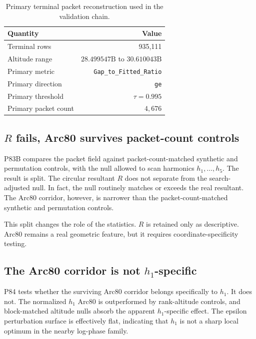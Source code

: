 \documentclass[11pt]{article}
\newcommand{\terminalrows}{935{,}111}
\newcommand{\terminalmin}{28.499547\mathrm{B}}
\newcommand{\terminalmax}{30.610043\mathrm{B}}
\newcommand{\primarypackets}{4{,}676}
\begin{document}
\begin{table}[H]
\centering
\small
\begin{tabular}{lr}
\toprule
\textbf{Quantity} & \textbf{Value} \\
\midrule
Terminal rows & \terminalrows \\
Altitude range & \(\terminalmin\) to \(\terminalmax\) \\
Primary metric & \texttt{Gap\_to\_Fitted\_Ratio} \\
Primary direction & \texttt{ge} \\
Primary threshold & \(\tau=0.995\) \\
Primary packet count & \(\primarypackets\) \\
\bottomrule
\end{tabular}
\caption{Primary terminal packet reconstruction used in the validation chain.}
\label{tab:primary-packet-reconstruction}
\end{table}

\subsection{\texorpdfstring{\(R\)}{R} fails, Arc80 survives packet-count controls}

P83B compares the packet field against packet-count-matched synthetic and permutation controls, with the null allowed to scan harmonics \(h_1,\ldots,h_5\). The result is split. The circular resultant \(R\) does not separate from the search-adjusted null. In fact, the null routinely matches or exceeds the real resultant. The Arc80 corridor, however, is narrower than the packet-count-matched synthetic and permutation controls.

This split changes the role of the statistics. \(R\) is retained only as descriptive. Arc80 remains a real geometric feature, but it requires coordinate-specificity testing.

\subsection{The Arc80 corridor is not \texorpdfstring{\(h_1\)}{h1}-specific}

P84 tests whether the surviving Arc80 corridor belongs specifically to \(h_1\). It does not. The normalized \(h_1\) Arc80 is outperformed by rank-altitude controls, and block-matched altitude nulls absorb the apparent \(h_1\)-specific effect. The epsilon perturbation surface is effectively flat, indicating that \(h_1\) is not a sharp local optimum in the nearby log-phase family.
\end{document}
